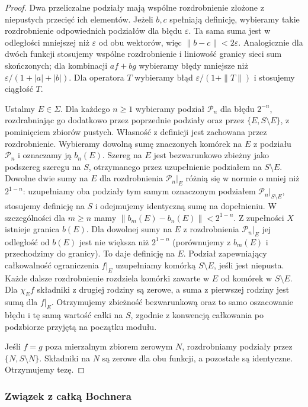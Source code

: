 \begin{proof}
Dwa przeliczalne podziały mają wspólne rozdrobnienie
złożone z niepustych przecięć ich elementów. Jeżeli
$b,c$ spełniają definicję, wybieramy takie rozdrobnienie
odpowiednich podziałów dla błędu $\varepsilon$.
Ta sama suma jest w odległości mniejszej niż $\varepsilon$
od obu wektorów, więc $\|b-c\|<2\varepsilon$.
Analogicznie dla dwóch funkcji stosujemy wspólne
rozdrobnienie i liniowość granicy sieci sum skończonych;
dla kombinacji $af+bg$ wybieramy błędy mniejsze niż
$\varepsilon/(1+|a|+|b|)$. Dla operatora $T$ wybieramy
błąd $\varepsilon/(1+\|T\|)$ i stosujemy ciągłość $T$.

Ustalmy $E\in\Sigma$. Dla każdego $n\ge1$ wybieramy
podział $\mathcal P_n$ dla błędu $2^{-n}$, rozdrabniając
go dodatkowo przez poprzednie podziały oraz przez
$\{E,S\setminus E\}$, z pominięciem zbiorów pustych.
Własność z definicji jest zachowana przez rozdrobnienie.
Wybieramy dowolną sumę znaczonych komórek na $E$
z podziału $\mathcal P_n$ i oznaczamy ją $b_n(E)$.
Szereg na $E$ jest bezwarunkowo zbieżny jako podszereg
szeregu na $S$, otrzymanego przez uzupełnienie
podziałem na $S\setminus E$. Dowolne dwie sumy na $E$
dla rozdrobnienia $\mathcal P_n|_E$ różnią się w normie
o mniej niż $2^{1-n}$: uzupełniamy oba podziały tym
samym oznaczonym podziałem $\mathcal P_n|_{S\setminus E}$,
stosujemy definicję na $S$ i odejmujemy identyczną
sumę na dopełnieniu. W szczególności dla $m\ge n$
mamy $\|b_m(E)-b_n(E)\|<2^{1-n}$. Z zupełności $X$
istnieje granica $b(E)$. Dla dowolnej sumy na $E$
z rozdrobnienia $\mathcal P_n|_E$ jej odległość od $b(E)$
jest nie większa niż $2^{1-n}$ (porównujemy z $b_m(E)$
i przechodzimy do granicy). To daje definicję na $E$.
Podział zapewniający całkowalność ograniczenia $f|_E$
uzupełniamy komórką $S\setminus E$, jeśli jest niepusta.
Każde dalsze rozdrobnienie rozdziela komórki zawarte
w $E$ od komórek w $S\setminus E$. Dla $\chi_E f$
składniki z drugiej rodziny są zerowe, a suma z pierwszej
rodziny jest sumą dla $f|_E$. Otrzymujemy zbieżność
bezwarunkową oraz to samo oszacowanie błędu i tę samą
wartość całki na $S$, zgodnie z konwencją całkowania
po podzbiorze przyjętą na początku modułu.

Jeśli $f=g$ poza mierzalnym zbiorem zerowym $N$,
rozdrobniamy podziały przez $\{N,S\setminus N\}$.
Składniki na $N$ są zerowe dla obu funkcji,
a pozostałe są identyczne. Otrzymujemy tezę.
\end{proof}

\subsubsection{Związek z całką Bochnera}

